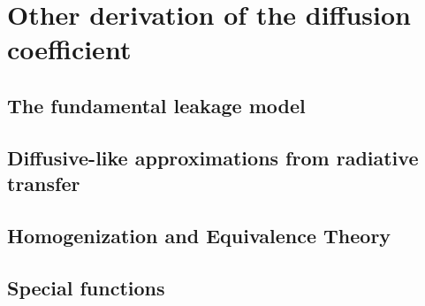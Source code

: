 \documentclass[black]{slideCEA}
\begin{document}

\backupbegin
\setcounter{SectionCounter}{\thesection}
\addtocounter{SectionCounter}{-1}

\section*{Other derivation of the diffusion coefficient}
\subsection*{The fundamental leakage model}

\subsection*{Diffusive-like approximations from radiative transfer}

\subsection*{Homogenization and Equivalence Theory}

\subsection*{Special functions}


\backupend
\end{document}

